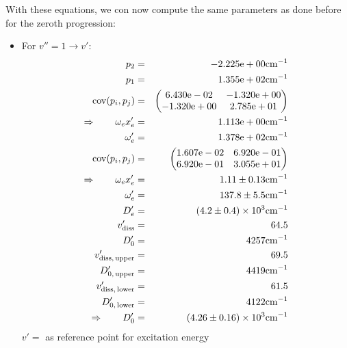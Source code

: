 With these equations, we con now compute the same parameters as done before for the 
zeroth progression:
\begin{itemize}
    \item For $v'' = 1 \rightarrow v'$:
        \begin{eqnarray}
            p_2 &=& -2.225\mathrm{e}+00 \mathrm{cm^{-1}} \nonumber \\
            p_1 &=& 1.355\mathrm{e}+02 \mathrm{cm^{-1}} \nonumber \\
            \mathrm{cov}(p_i, p_j) &=& 
            \begin{pmatrix}
                6.430\mathrm{e}-02 &-1.320\mathrm{e}+00 \\
                -1.320\mathrm{e}+00 &2.785\mathrm{e}+01 \\
            \end{pmatrix}
            \\ \Rightarrow \qquad
            \omega_e x_e' &=& 1.113\mathrm{e}+00 \mathrm{cm^{-1}} \nonumber \\
            \omega_e' &=& 1.378\mathrm{e}+02 \mathrm{cm^{-1}} \nonumber \\
            \mathrm{cov}(p_i, p_j) &=& 
            \begin{pmatrix}
                1.607\mathrm{e}-02 &6.920\mathrm{e}-01 \\
                6.920\mathrm{e}-01 &3.055\mathrm{e}+01 \\
            \end{pmatrix}
            \\ \Rightarrow \qquad
            \omega_e x_e' &=& 1.11 \pm 0.13 \mathrm{cm^{-1}}\\
            \omega_e' &=& 137.8 \pm 5.5 \mathrm{cm^{-1}} \\
            D_e' &=& \left(4.2 \pm 0.4\right) \times 10^{3} \mathrm{cm^{-1}} \\
            v_\mathrm{diss}' &=& 64.5 \\
            D_0' &=& 4257 \mathrm{cm^{-1}} \\
            v_\mathrm{diss,\, upper}' &=& 69.5 \\
            D_{0,\, \mathrm{upper}}' &=& 4419 \mathrm{cm^{-1}}\\
            v_\mathrm{diss,\, lower}' &=& 61.5 \\
            D_{0,\, \mathrm{lower}}' &=& 4122 \mathrm{cm^{-1}} \\
            \Rightarrow \qquad
            D_0' &=& \left(4.26 \pm 0.16\right) \times 10^{3} \mathrm{cm^{-1}}
        \end{eqnarray}
        $v' = $ as reference point for excitation energy
\end{itemize}
